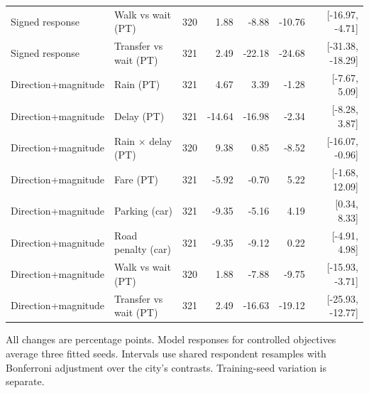 \begin{longtable}{@{\extracolsep{\fill}}llrrrrr@{}}
Signed response & Walk vs wait (PT) & 320 & 1.88 & -8.88 & -10.76 & [-16.97, -4.71] \\
Signed response & Transfer vs wait (PT) & 321 & 2.49 & -22.18 & -24.68 & [-31.38, -18.29] \\
Direction+magnitude & Rain (PT) & 321 & 4.67 & 3.39 & -1.28 & [-7.67, 5.09] \\
Direction+magnitude & Delay (PT) & 321 & -14.64 & -16.98 & -2.34 & [-8.28, 3.87] \\
Direction+magnitude & Rain $\times$ delay (PT) & 320 & 9.38 & 0.85 & -8.52 & [-16.07, -0.96] \\
Direction+magnitude & Fare (PT) & 321 & -5.92 & -0.70 & 5.22 & [-1.68, 12.09] \\
Direction+magnitude & Parking (car) & 321 & -9.35 & -5.16 & 4.19 & [0.34, 8.33] \\
Direction+magnitude & Road penalty (car) & 321 & -9.35 & -9.12 & 0.22 & [-4.91, 4.98] \\
Direction+magnitude & Walk vs wait (PT) & 320 & 1.88 & -7.88 & -9.75 & [-15.93, -3.71] \\
Direction+magnitude & Transfer vs wait (PT) & 321 & 2.49 & -16.63 & -19.12 & [-25.93, -12.77] \\\end{longtable}
\noindent All changes are percentage points. Model responses for controlled objectives average three fitted seeds. Intervals use shared respondent resamples with Bonferroni adjustment over the city's contrasts. Training-seed variation is separate.
\endgroup

